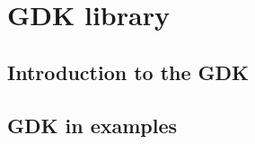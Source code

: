 
\section{GDK library}
\label{gdk}

\subsection{Introduction to the GDK}

\subsection{GDK in examples}
